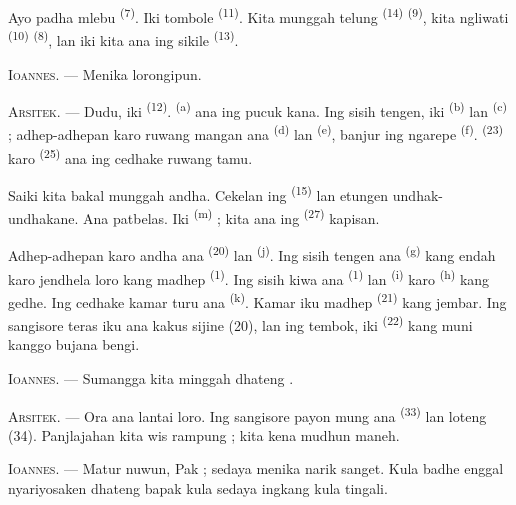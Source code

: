 Ayo padha mlebu  \textsuperscript{(7)}. Iki
tombole  \textsuperscript{(11)}. Kita munggah telung
 \textsuperscript{(14)}  \textsuperscript{(9)}, kita ngliwati 
\textsuperscript{(10)}  \textsuperscript{(8)}, lan
iki kita ana ing sikile  \textsuperscript{(13)}.

\textsc{Ioannes}. --- Menika lorongipun.

\textsc{Arsitek}. --- Dudu, iki 
\textsuperscript{(12)}.  \textsuperscript{(a)} ana ing
pucuk kana. Ing sisih tengen, iki 
\textsuperscript{(b)} lan  \textsuperscript{(c)} ;
adhep-adhepan karo ruwang mangan ana 
\textsuperscript{(d)} lan  \textsuperscript{(e)},
banjur ing ngarepe  \textsuperscript{(f)}.
 \textsuperscript{(23)} karo 
\textsuperscript{(25)} ana ing cedhake ruwang tamu.

Saiki kita bakal munggah andha. Cekelan ing 
\textsuperscript{(15)} lan etungen undhak-undhakane. Ana patbelas. Iki
 \textsuperscript{(m)} ; kita ana ing 
\textsuperscript{(27)} kapisan.

\VUsaut{3.0mm}
\VUsaut{3.0mm}

Adhep-adhepan karo andha ana  \textsuperscript{(20)} lan
 \textsuperscript{(j)}. Ing sisih tengen ana
 \textsuperscript{(g)} kang endah karo jendhela loro
kang madhep  \textsuperscript{(1)}. Ing sisih
kiwa ana  \textsuperscript{(1)} lan  \textsuperscript{(i)} karo 
\textsuperscript{(h)} kang gedhe. Ing cedhake kamar turu ana
 \textsuperscript{(k)}. Kamar iku madhep
 \textsuperscript{(21)} kang jembar. Ing sangisore teras
iku ana kakus sijine (20), lan ing tembok, iki 
\textsuperscript{(22)} kang muni kanggo bujana bengi.

\textsc{Ioannes}. --- Sumangga kita minggah dhateng .

\textsc{Arsitek}. --- Ora ana lantai loro. Ing sangisore payon mung
ana  \textsuperscript{(33)} lan loteng (34).
Panjlajahan kita wis rampung ; kita kena mudhun maneh.

\textsc{Ioannes}. --- Matur nuwun, Pak ; sedaya menika narik sanget.
Kula badhe enggal nyariyosaken dhateng bapak kula sedaya ingkang kula
tingali.

\VUsaut{4.0mm}
\VUfilet{22mm}
